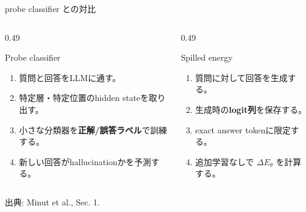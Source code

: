 \documentclass[dvipdfmx,uplatex,unicode,9pt,aspectratio=169]{beamer}
\newcommand{\source}[1]{\vfill{\tiny\color{GrayText}出典: #1}}
\newcommand{\DeltaE}{\Delta E_{\theta}}
\begin{document}
\begin{frame}{probe classifier との対比}
\begin{columns}[T,onlytextwidth]
\begin{column}{0.49\linewidth}
\begin{block}{Probe classifier}
\begin{enumerate}
\item 質問と回答をLLMに通す。
\item 特定層・特定位置のhidden stateを取り出す。
\item 小さな分類器を\textbf{正解/誤答ラベル}で訓練する。
\item 新しい回答がhallucinationかを予測する。
\end{enumerate}
\end{block}
\end{column}
\begin{column}{0.49\linewidth}
\begin{block}{Spilled energy}
\begin{enumerate}
\item 質問に対して回答を生成する。
\item 生成時の\textbf{logit列}を保存する。
\item exact answer tokenに限定する。
\item 追加学習なしで $\DeltaE$ を計算する。
\end{enumerate}
\end{block}
\end{column}
\end{columns}
\vspace{0.8em}
\begin{center}
\end{center}
\source{Minut et al., Sec. 1.}
\end{frame}
\end{document}
